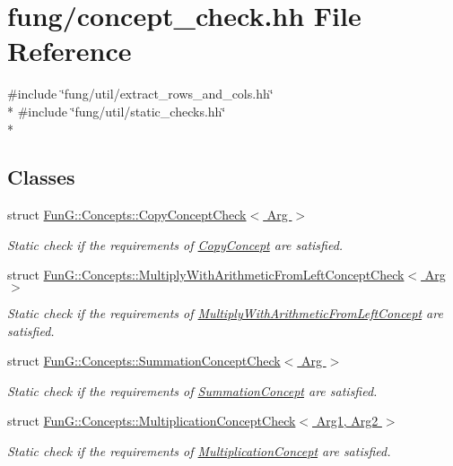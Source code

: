 \hypertarget{concept__check_8hh}{\section{fung/concept\-\_\-check.hh File Reference}
\label{concept__check_8hh}
}
{\ttfamily \#include \char`\"{}fung/util/extract\-\_\-rows\-\_\-and\-\_\-cols.\-hh\char`\"{}}\\*
{\ttfamily \#include \char`\"{}fung/util/static\-\_\-checks.\-hh\char`\"{}}\\*
\subsection*{Classes}
\begin{DoxyCompactItemize}
\item 
struct \hyperlink{structFunG_1_1Concepts_1_1CopyConceptCheck}{Fun\-G\-::\-Concepts\-::\-Copy\-Concept\-Check$<$ Arg $>$}
\begin{DoxyCompactList}\small\item\em Static check if the requirements of \hyperlink{structFunG_1_1Concepts_1_1CopyConcept}{Copy\-Concept} are satisfied. \end{DoxyCompactList}\item 
struct \hyperlink{structFunG_1_1Concepts_1_1MultiplyWithArithmeticFromLeftConceptCheck}{Fun\-G\-::\-Concepts\-::\-Multiply\-With\-Arithmetic\-From\-Left\-Concept\-Check$<$ Arg $>$}
\begin{DoxyCompactList}\small\item\em Static check if the requirements of \hyperlink{structFunG_1_1Concepts_1_1MultiplyWithArithmeticFromLeftConcept}{Multiply\-With\-Arithmetic\-From\-Left\-Concept} are satisfied. \end{DoxyCompactList}\item 
struct \hyperlink{structFunG_1_1Concepts_1_1SummationConceptCheck}{Fun\-G\-::\-Concepts\-::\-Summation\-Concept\-Check$<$ Arg $>$}
\begin{DoxyCompactList}\small\item\em Static check if the requirements of \hyperlink{structFunG_1_1Concepts_1_1SummationConcept}{Summation\-Concept} are satisfied. \end{DoxyCompactList}\item 
struct \hyperlink{structFunG_1_1Concepts_1_1MultiplicationConceptCheck}{Fun\-G\-::\-Concepts\-::\-Multiplication\-Concept\-Check$<$ Arg1, Arg2 $>$}
\begin{DoxyCompactList}\small\item\em Static check if the requirements of \hyperlink{structFunG_1_1Concepts_1_1MultiplicationConcept}{Multiplication\-Concept} are satisfied. \end{DoxyCompactList}\item 

\end{DoxyCompactItemize}
